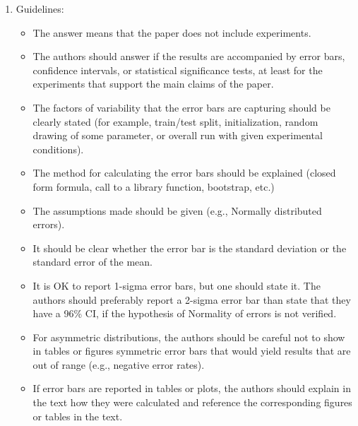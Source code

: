\begin{enumerate}
    \item[] Guidelines:
    \begin{itemize}
        \item The answer \answerNA{} means that the paper does not include experiments.
        \item The authors should answer \answerYes{} if the results are accompanied by error bars, confidence intervals, or statistical significance tests, at least for the experiments that support the main claims of the paper.
        \item The factors of variability that the error bars are capturing should be clearly stated (for example, train/test split, initialization, random drawing of some parameter, or overall run with given experimental conditions).
        \item The method for calculating the error bars should be explained (closed form formula, call to a library function, bootstrap, etc.)
        \item The assumptions made should be given (e.g., Normally distributed errors).
        \item It should be clear whether the error bar is the standard deviation or the standard error of the mean.
        \item It is OK to report 1-sigma error bars, but one should state it. The authors should preferably report a 2-sigma error bar than state that they have a 96\% CI, if the hypothesis of Normality of errors is not verified.
        \item For asymmetric distributions, the authors should be careful not to show in tables or figures symmetric error bars that would yield results that are out of range (e.g., negative error rates).
        \item If error bars are reported in tables or plots, the authors should explain in the text how they were calculated and reference the corresponding figures or tables in the text.
    \end{itemize}


\end{enumerate}

